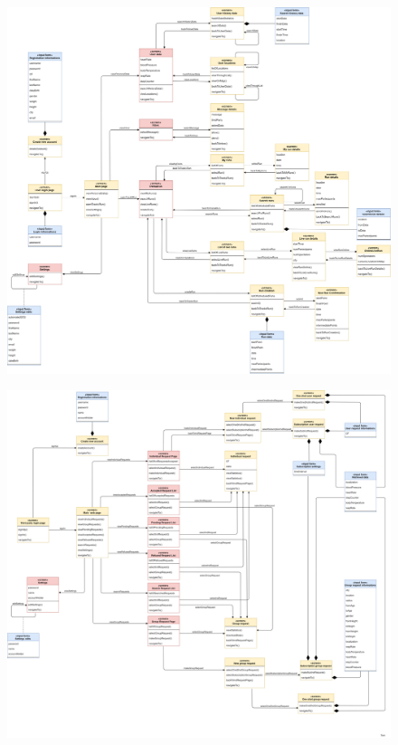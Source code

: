 \begin{figure}[H]
    \centering
    \includegraphics[width=1\textwidth]{DD/Pictures/UXMobile.png}
    
\end{figure}

\begin{figure}[H]
    \centering
    \includegraphics[width=1\textwidth]{DD/Pictures/UXWeb.png}
    
\end{figure}